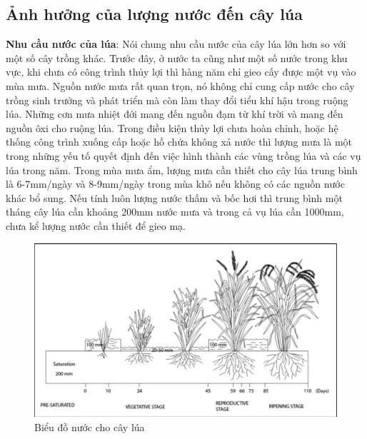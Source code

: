 \documentclass[12pt]{report}
\begin{document}
\subsection{Ảnh hưởng của lượng nước đến cây lúa} %
\label{sub:ảnh_hưởng_của_lượng_nước_đến_cây_lúa}
\begin{flushleft}
	\textbf{Nhu cầu nước của lúa}: Nói chung nhu cầu nước của cây lúa lớn hơn so với một số cây trồng khác. Trước đây, ở nước ta cũng như một số nước trong khu vực, khi chưa có công trình thủy lợi thì hàng năm chỉ gieo cấy được một vụ vào mùa mưa. Nguồn nước mưa rất quan trọn, nó không chỉ cung cấp nước cho cây trồng sinh trưởng và phát triển mà còn làm thay đổi tiểu khí hậu trong ruộng lúa. Những cơn mưa nhiệt đới mang đến nguồn đạm từ khí trời và mang đến nguồn ôxi cho ruộng lúa. Trong điều kiện thủy lợi chưa hoàn chỉnh, hoặc hệ thống công trình xuống cấp hoặc hồ chứa không xả nước thì lượng mưa là một trong những yếu tố quyết định đến việc hình thành các vùng trồng lúa và các vụ lúa trong năm. Trong mùa mưa ẩm, lượng mưa cần thiết cho cây lúa trung bình là 6-7mm/ngày và 8-9mm/ngày trong mùa khô nếu không có các nguồn nước khác bổ sung. Nếu tính luôn lượng nước thấm và bốc hơi thì trung bình một tháng cây lúa cần khoảng 200mm nước mưa và trong cả vụ lúa cần 1000mm, chưa kể lượng nước cần thiết để gieo mạ.

	\begin{figure}[!htbp]
		\centering
		\includegraphics[width = \textwidth]{images/sodonuoc.png}
		\caption{Biểu đồ nước cho cây lúa}
		\label{fig:image}
	\end{figure}
\end{flushleft}

\newpage
\end{document}
